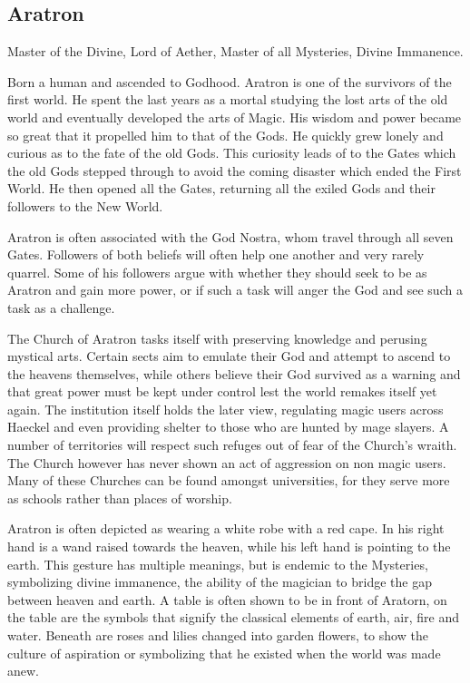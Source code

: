 \begin{multicols}{2}
\subsection{Aratron} Master of the Divine, Lord of Aether, Master of all Mysteries, Divine Immanence.

Born a human and ascended to Godhood. Aratron is one of the survivors of the first world. He spent the last years as a mortal studying the lost arts of the old world and eventually developed the arts of Magic. His wisdom and power became so great that it propelled him to that of the Gods. He quickly grew lonely and curious as to the fate of the old Gods. This curiosity leads of to the Gates which the old Gods stepped through to avoid the coming disaster which ended the First World. He then opened all the Gates, returning all the exiled Gods and their followers to the New World.

Aratron is often associated with the God Nostra, whom travel through all seven Gates. Followers of both beliefs will often help one another and very rarely quarrel. Some of his followers argue with whether they should seek to be as Aratron and gain more power, or if such a task will anger the God and see such a task as a challenge.

The Church of Aratron tasks itself with preserving knowledge and perusing mystical arts. Certain sects aim to emulate their God and attempt to ascend to the heavens themselves, while others believe their God survived as a warning and that great power must be kept under control lest the world remakes itself yet again. The institution itself holds the later view, regulating magic users across Haeckel and even providing shelter to those who are hunted by mage slayers. A number of territories will respect such refuges out of fear of the Church's wraith. The Church however has never shown an act of aggression on non magic users. Many of these Churches can be found amongst universities, for they serve more as schools rather than places of worship.

Aratron is often depicted as wearing a white robe with a red cape. In his right hand is a wand raised towards the heaven, while his left hand is pointing to the earth. This gesture has multiple meanings, but is endemic to the Mysteries, symbolizing divine immanence, the ability of the magician to bridge the gap between heaven and earth. A table is often shown to be in front of Aratorn, on the table are the symbols that signify the classical elements of earth, air, fire and water. Beneath are roses and lilies changed into garden flowers, to show the culture of aspiration or symbolizing that he existed when the world was made anew.


\end{multicols}

